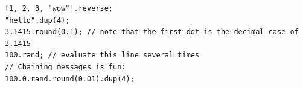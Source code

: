  
\begin{lstlisting}[style=SuperCollider-IDE, basicstyle=\scttfamily\footnotesize]
[1, 2, 3, "wow"].reverse;
"hello".dup(4); 
3.1415.round(0.1); // note that the first dot is the decimal case of 3.1415
100.rand; // evaluate this line several times
// Chaining messages is fun:
100.0.rand.round(0.01).dup(4);
\end{lstlisting}